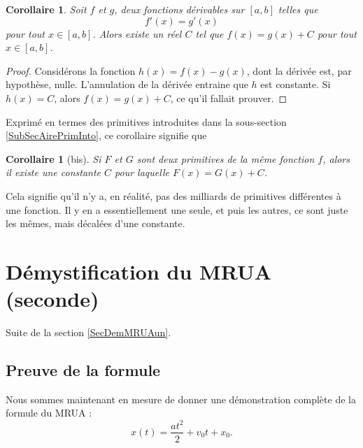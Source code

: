 \documentclass[a4paper,12pt]{book}
\newcounter{numtho}
\theoremstyle{mes_exemples}	\newtheorem{exemple}[numtho]{Exemple}
\theoremstyle{mes_tho}
\newtheorem{corollary}[numtho]{Corollaire}
\begin{document}
\begin{corollary}
	Soit $f$ et $g$, deux fonctions dérivables sur $[a,b]$ telles que
	\begin{equation}
		f'(x) = g'(x)
	\end{equation}
	pour tout $x \in [a,b]$. Alors existe un réel $C$ tel que $f (x) = g (x) + C$ pour tout $x\in [a,b]$.
\end{corollary}

\begin{proof}
	Considérons la fonction $h(x)=f(x)-g(x)$, dont la dérivée est, par hypothèse, nulle. L'annulation de la dérivée entraine que $h$ est  constante. Si $h(x)=C$, alors $f(x)=g(x)+C$, ce qu'il fallait prouver.
\end{proof}
\addtocounter{numtho}{-1}

Exprimé en termes des primitives introduites dans la sous-section \ref{SubSecAirePrimInto}, ce corollaire signifie que
\begin{corollary}[bis]	\label{CorZeroCst}
	Si $F$ et $G$ sont deux primitives de la même fonction $f$, alors il existe une constante $C$ pour laquelle $F(x)=G(x)+C$.
\end{corollary}
Cela signifie qu'il n'y a, en réalité, pas des milliards de primitives différentes à une fonction. Il y en a essentiellement une seule, et puis les autres, ce sont juste les mêmes, mais décalées d'une constante.

					\section{Démystification du MRUA (seconde)}
\label{SecMRUAsecondeGGdQoT}

Suite de la section \ref{SecDemMRUAun}.

					\subsection{Preuve de la formule}

Nous sommes maintenant en mesure de donner une démonstration complète de la formule du MRUA :
\begin{equation}	\label{EqMRUAINT}
	x(t) = \frac{ at^2 }{ 2 } + v_0t +x_0.
\end{equation}
\end{document}
